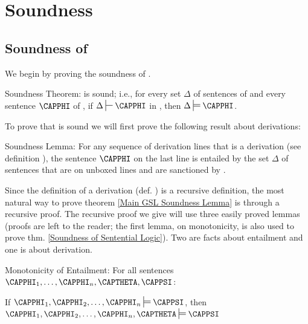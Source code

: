 \section{Soundness}

\subsection{Soundness of \GSD{}}
We begin by proving the soundness of \GSD{}.
\begin{THEOREM}{ \GSD{} Soundness Theorem:}
\GSD{} is sound; i.e., for every set $\Delta$ of sentences of \GSL{} and every sentence $\CAPPHI$ of \GSL{}, if $\Delta\sststile{}{}\CAPPHI$ in \GSD{}, then $\Delta\sdtstile{}{}\CAPPHI$.
\end{THEOREM}
\noindent{}To prove that \GSD{} is sound we will first prove the following result about derivations:
\begin{THEOREM}{ Soundness Lemma:}
For any sequence of derivation lines that is a derivation (see definition ), the sentence $\CAPPHI$ on the last line is entailed by the set $\Delta$ of sentences that are on unboxed lines and are sanctioned by . 
\end{THEOREM}
\noindent{}Since the definition of a derivation (def. ) is a recursive definition, the most natural way to prove theorem \ref{Main GSL Soundness Lemma} is through a recursive proof. 
The recursive proof we give will use three easily proved lemmas (proofs are left to the reader; the first lemma, on monotonicity, is also used to prove thm. \ref{Soundness of Sentential Logic}). 
Two are facts about entailment and one is about derivation.
\begin{THEOREM}{ Monotonicity of Entailment:}
For all \GSL{} sentences $\CAPPHI_1,\ldots,\CAPPHI_{\integer{n}},\CAPTHETA,\CAPPSI$:
\begin{center}
If $\CAPPHI_1,\CAPPHI_2,\ldots,\CAPPHI_{\integer{n}}\sdtstile{}{}\CAPPSI$, then $\CAPPHI_1,\CAPPHI_2,\ldots,\CAPPHI_{\integer{n}},\CAPTHETA\sdtstile{}{}\CAPPSI$
\end{center}
\end{THEOREM}
